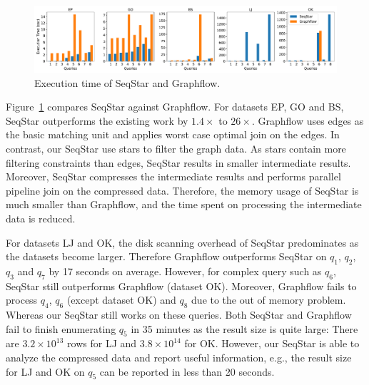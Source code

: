 \begin{figure}[ht]
  \centering
  \includegraphics[width=\textwidth]{img/exp_compare.pdf}
  \caption{Execution time of SeqStar and Graphflow.}\label{img:exp_compare}
\end{figure}

Figure~\ref{img:exp_compare} compares SeqStar against Graphflow.
For datasets EP, GO and BS, SeqStar outperforms the existing work by $1.4\times$ to $26\times$.
Graphflow uses edges as the basic matching unit and applies worst case optimal join on the edges.
In contrast, our SeqStar use stars to filter the graph data.
As stars contain more filtering constraints than edges, SeqStar results in smaller intermediate results.
Moreover, SeqStar compresses the intermediate results and performs parallel pipeline join on the compressed data.
Therefore, the memory usage of SeqStar is much smaller than Graphflow,
and the time spent on processing the intermediate data is reduced.

For datasets LJ and OK, the disk scanning overhead of SeqStar predominates as the datasets become larger.
Therefore Graphflow outperforms SeqStar on $q_1$, $q_2$, $q_3$ and $q_7$ by 17 seconds on average.
However, for complex query such as $q_6$, SeqStar still outperforms Graphflow (dataset OK).
Moreover, Graphflow fails to process $q_4$, $q_6$ (except dataset OK) and $q_8$ due to the out of memory problem.
Whereas our SeqStar still works on these queries.
Both SeqStar and Graphflow fail to finish enumerating $q_5$ in 35 minutes as the result size is quite large:
There are $3.2 \times 10^{13}$ rows for LJ and $3.8 \times 10^{14}$ for OK\@.
However, our SeqStar is able to analyze the compressed data and report useful information,
e.g., the result size for LJ and OK on $q_5$ can be reported in less than 20 seconds.

